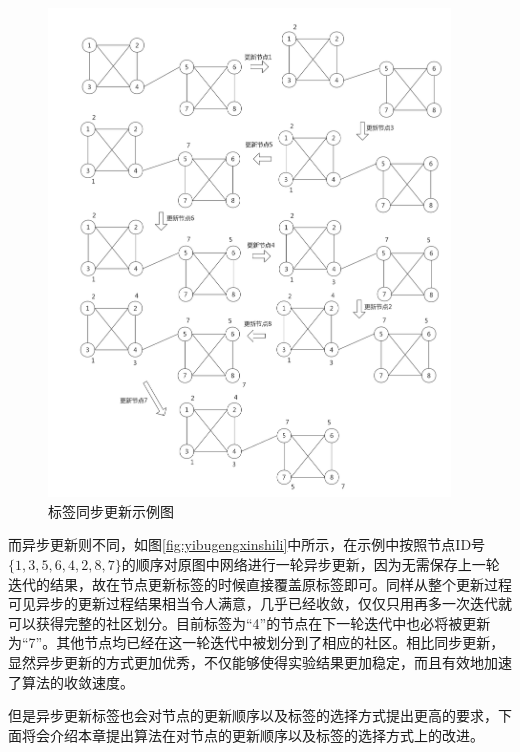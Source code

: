 \begin{figure}
  \centering
  \includegraphics[width=0.95\textwidth]{figures/tongbugengxinshili}
  \caption{标签同步更新示例图}\label{fig:tongbugengxinshili}
\end{figure}

而异步更新则不同，如图\ref{fig:yibugengxinshili}中所示，在示例中按照节点ID号$\{1,3,5,6,4,2,8,7 \} $的顺序对原图中网络进行一轮异步更新，因为无需保存上一轮迭代的结果，故在节点更新标签的时候直接覆盖原标签即可。同样从整个更新过程可见异步的更新过程结果相当令人满意，几乎已经收敛，仅仅只用再多一次迭代就可以获得完整的社区划分。目前标签为“4”的节点在下一轮迭代中也必将被更新为“7”。其他节点均已经在这一轮迭代中被划分到了相应的社区。相比同步更新，显然异步更新的方式更加优秀，不仅能够使得实验结果更加稳定，而且有效地加速了算法的收敛速度。

但是异步更新标签也会对节点的更新顺序以及标签的选择方式提出更高的要求，下面将会介绍本章提出算法在对节点的更新顺序以及标签的选择方式上的改进。

